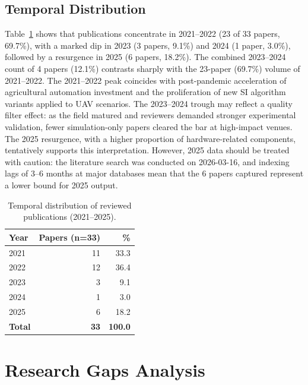 \documentclass[review,3p,times]{elsarticle}
\begin{document}
\subsection{Temporal Distribution}
Table~\ref{tab:temporal} shows that publications concentrate in 2021--2022 (23 of 33 papers, 69.7\%), with a marked dip in 2023 (3 papers, 9.1\%) and 2024 (1 paper, 3.0\%), followed by a resurgence in 2025 (6 papers, 18.2\%). The combined 2023--2024 count of 4 papers (12.1\%) contrasts sharply with the 23-paper (69.7\%) volume of 2021--2022. The 2021--2022 peak coincides with post-pandemic acceleration of agricultural automation investment and the proliferation of new SI algorithm variants applied to UAV scenarios. The 2023--2024 trough may reflect a quality filter effect: as the field matured and reviewers demanded stronger experimental validation, fewer simulation-only papers cleared the bar at high-impact venues. The 2025 resurgence, with a higher proportion of hardware-related components, tentatively supports this interpretation. However, 2025 data should be treated with caution: the literature search was conducted on 2026-03-16, and indexing lags of 3--6 months at major databases mean that the 6 papers captured represent a lower bound for 2025 output.

\begin{table}[htbp]
\centering
\caption{Temporal distribution of reviewed publications (2021--2025).}
\label{tab:temporal}
\begin{tabular}{lrr}
\toprule
\textbf{Year} & \textbf{Papers (n=33)} & \textbf{\%} \\
\midrule
2021 & 11 & 33.3 \\
2022 & 12 & 36.4 \\
2023 & 3  & 9.1  \\
2024 & 1  & 3.0  \\
2025 & 6  & 18.2 \\
\midrule
\textbf{Total} & \textbf{33} & \textbf{100.0} \\
\bottomrule
\end{tabular}
\end{table}

\section{Research Gaps Analysis}
\end{document}
